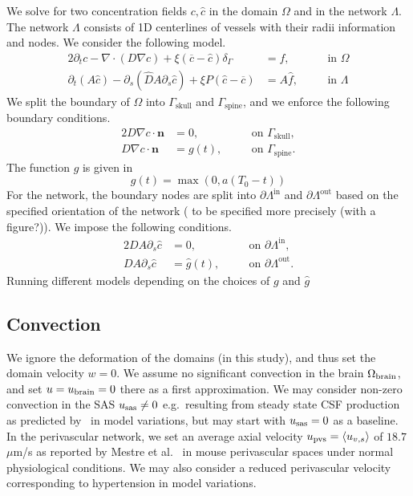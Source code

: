 \documentclass[fleqn,10pt]{wlscirep}
\begin{document}
We solve for two concentration fields $c, \hat c$ in the domain $\Omega$ and in the network $\Lambda$. The 
network $\Lambda$ consists of 1D centerlines of vessels with their radii information and nodes. We consider the following model. 
\begin{alignat}{2}
\partial_t c - \nabla \cdot (D \nabla c ) + \xi (\overline{c} - \hat c ) \delta_\Gamma & = f, && \quad \mathrm{in } \,\, \Omega \\ 
\partial_t (A\hat c) - \partial_s(\hat D A  \partial_s \hat c) + \xi P (\hat c - \overline{c})   & = A \hat f, && \quad \mathrm{in } \,\,  \Lambda 
 \end{alignat}
We split the boundary of $\Omega$ into $\Gamma_{\mathrm{skull}}$ and $\Gamma_{\mathrm{spine}}$,  and we enforce the following boundary conditions. 
\begin{alignat}{2}
D \nabla c \cdot \bm{n} &= 0, && \quad \mathrm{on} \,\, \Gamma_{\mathrm{skull}}, \\ 
D \nabla c \cdot \bm{n} &= g(t),  && \quad \mathrm{on} \,\, \Gamma_{\mathrm{spine}}.
\end{alignat}
The function $g$ is given in 
\begin{equation*}
    g(t) = \max(0, a(T_0 - t))
\end{equation*}
For the network, the boundary nodes are split into $\partial \Lambda^{\mathrm{in}}$  and $\partial \Lambda^{\mathrm{out}}$ based on the specified orientation of the network (\color{blue} to be specified more precisely (with a figure?)\color{black}). We impose the following conditions. 
\begin{alignat}{2}
D A \partial_s \hat c &= 0, && \quad \mathrm{on} \,\, \partial \Lambda^ {\mathrm{in}}, \\ 
D A \partial_s  \hat c &= \hat g(t),  && \quad \mathrm{on} \,\, \partial \Lambda^{\mathrm{out}} .
\end{alignat}
\color{blue} Running different models depending on the choices of $g$ and $\hat g$ \color{black}
 \subsection*{Convection}
We ignore the deformation of the domains (in this study), and thus set the domain velocity $w = 0$. We assume no significant convection in the brain $\Omega_{\rm brain}$, and set $u = u_{\rm brain} = 0$ there as a first approximation. We may consider non-zero convection in the SAS $u_{\rm sas} \not = 0$ e.g.~resulting from steady state CSF production as predicted by~\cite{hornkjol2022csf} in model variations, but may start with $u_{\rm sas} = 0$ as a baseline. In the perivascular network, we set an average axial velocity $u_{\rm pvs} = \langle u_{v, s} \rangle$ of $18.7$ $\mu$m/s as reported by Mestre et al.~\cite{mestre2018flow} in mouse perivascular spaces under normal physiological conditions. We may also consider a reduced perivascular velocity corresponding to hypertension in model variations.
\end{document}
